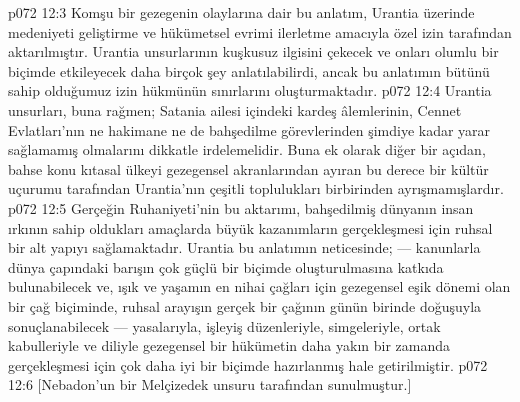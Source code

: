 \vs p072 12:3 Komşu bir gezegenin olaylarına dair bu anlatım, Urantia üzerinde medeniyeti geliştirme ve hükümetsel evrimi ilerletme amacıyla özel izin tarafından aktarılmıştır. Urantia unsurlarının kuşkusuz ilgisini çekecek ve onları olumlu bir biçimde etkileyecek daha birçok şey anlatılabilirdi, ancak bu anlatımın bütünü sahip olduğumuz izin hükmünün sınırlarını oluşturmaktadır.
\vs p072 12:4 Urantia unsurları, buna rağmen; Satania ailesi içindeki kardeş âlemlerinin, Cennet Evlatları’nın ne hakimane ne de bahşedilme görevlerinden şimdiye kadar yarar sağlamamış olmalarını dikkatle irdelemelidir. Buna ek olarak diğer bir açıdan, bahse konu kıtasal ülkeyi gezegensel akranlarından ayıran bu derece bir kültür uçurumu tarafından Urantia’nın çeşitli toplulukları birbirinden ayrışmamışlardır.
\vs p072 12:5 Gerçeğin Ruhaniyeti’nin bu aktarımı, bahşedilmiş dünyanın insan ırkının sahip oldukları amaçlarda büyük kazanımların gerçekleşmesi için ruhsal bir alt yapıyı sağlamaktadır. Urantia bu anlatımın neticesinde; --- kanunlarla dünya çapındaki barışın çok güçlü bir biçimde oluşturulmasına katkıda bulunabilecek ve, ışık ve yaşamın en nihai çağları için gezegensel eşik dönemi olan bir çağ biçiminde, ruhsal arayışın gerçek bir çağının günün birinde doğuşuyla sonuçlanabilecek --- yasalarıyla, işleyiş düzenleriyle, simgeleriyle, ortak kabulleriyle ve diliyle gezegensel bir hükümetin daha yakın bir zamanda gerçekleşmesi için çok daha iyi bir biçimde hazırlanmış hale getirilmiştir.
\vs p072 12:6 [Nebadon’un bir Melçizedek unsuru tarafından sunulmuştur.]
